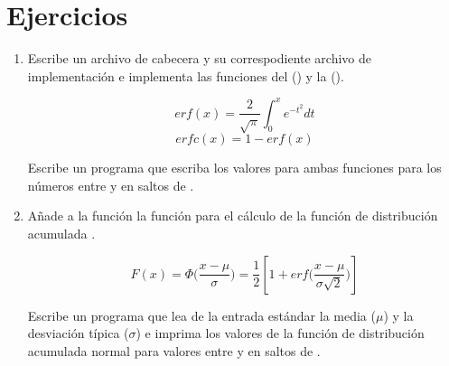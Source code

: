 \section{Ejercicios}

\begin{enumerate}

\item Escribe un archivo de cabecera  y su correspodiente
      archivo de implementación  e implementa las funciones
      del  () y
      la  ().

\[
erf(x) = \frac{2}{\sqrt{\pi}} \int_{0}^{x} e^{-t^2} dt
\]
\[
erfc(x) = 1 -erf(x)
\]

      Escribe un programa que escriba los valores para ambas funciones para los
      números entre  y  en saltos de .

\item Añade a la función  la función para el cálculo de la función
      de distribución acumulada .

\[
F(x) = \Phi \Big(\frac{x - \mu}{\sigma}\Big) = 
\frac{1}{2} \left[ 1 + erf \Big(\frac{x-\mu}{\sigma \sqrt{2}}\Big) \right]
\]

      Escribe un programa que lea de la entrada estándar la media ($\mu$) y la
      desviación típica ($\sigma$) e imprima los valores de la función de
      distribución acumulada normal para valores entre  y 
      en saltos de .

\end{enumerate}
